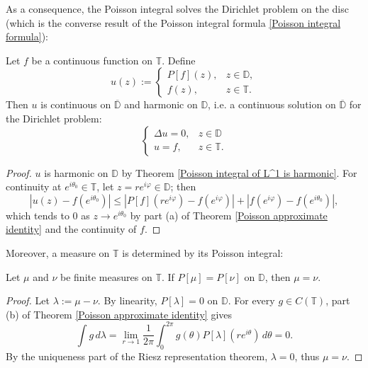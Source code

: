 As a consequence, the Poisson integral solves the Dirichlet problem on the disc (which is 
the converse result of the Poisson integral formula
 \ref{Poisson integral formula}):
\begin{corollary}\label{Dirichlet problem on the disc}
Let $f$ be a continuous function on $\mathbb{T}$. Define
\begin{equation*}
  u(z):=
  \begin{cases}
    P[f](z), & z\in\mathbb{D},\\
    f(z), & z\in\mathbb{T}.
  \end{cases}
\end{equation*}
Then $u$ is continuous on $\overline{\mathbb{D}}$ and harmonic on $\mathbb{D}$, i.e. 
a continuous solution on $\overline{\mathbb{D}}$ for the Dirichlet
problem:
\begin{equation*}
  \begin{cases}
  \Delta u=0, & z\in \mathbb{D}\\
  u=f, & z\in \mathbb{T}.
  \end{cases}
\end{equation*}
\end{corollary}
\begin{proof}
$u$ is harmonic on $\mathbb{D}$ by Theorem \ref{Poisson integral of L^1 is harmonic}. For
continuity at $e^{i\theta_0}\in\mathbb{T}$, let $z=re^{i\varphi}\in\mathbb{D}$; then
\begin{equation*}
  |u(z)-f(e^{i\theta_0})|\leq|P[f](re^{i\varphi})-f(e^{i\varphi})|+|f(e^{i\varphi})-f(e^{i\theta_0})|,
\end{equation*}
which tends to $0$ as $z\rightarrow e^{i\theta_0}$ by part (a) of
Theorem \ref{Poisson approximate identity} and the continuity of $f$.
\end{proof}

Moreover, a measure on $\mathbb{T}$ is determined by its Poisson integral:
\begin{corollary}
Let $\mu$ and $\nu$ be finite measures on $\mathbb{T}$. If $P[\mu]=P[\nu]$ on $\mathbb{D}$,
then $\mu=\nu$.
\end{corollary}
\begin{proof}
Let $\lambda:=\mu-\nu$. By linearity, $P[\lambda]=0$ on $\mathbb{D}$. For every $g\in C(\mathbb{T})$,
part (b) of Theorem \ref{Poisson approximate identity} gives
\begin{equation*}
  \int g\, d\lambda=\lim_{r\rightarrow 1}\frac{1}{2\pi}\int_0^{2\pi} g(\theta)P[\lambda](re^{i\theta})\, d\theta=0.
\end{equation*}
By the uniqueness part of the Riesz representation theorem, $\lambda=0$, thus $\mu=\nu$.
\end{proof}

